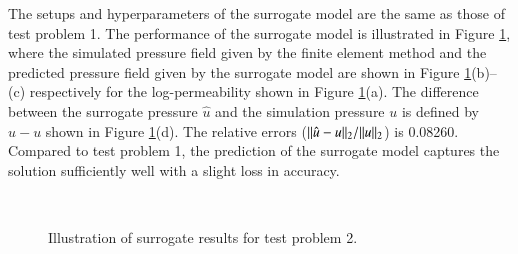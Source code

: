 The setups and hyperparameters of the surrogate model are the same as those of test problem 1. The performance of the surrogate model is illustrated in Figure \ref{highdim_surrogate_plot}, where the simulated pressure field given by the finite element method and the predicted pressure field given by the surrogate model are shown in Figure \ref{highdim_surrogate_plot}(b)--(c) respectively for the log-permeability shown in Figure \ref{highdim_surrogate_plot}(a). 
The difference between the surrogate pressure $\hat{u}$ and the simulation pressure $u$ is defined by $\hat{u}-u$ shown in Figure \ref{highdim_surrogate_plot}(d).
The relative errors ($\Arrowvert \hat{u}-u \Arrowvert_2/\Arrowvert u \Arrowvert_2$) is 0.08260.
Compared to test problem 1, the prediction of the surrogate model captures the solution sufficiently well with a slight loss in accuracy.    
\begin{figure}
	\centering
	\quad
	\\
	\quad
	\caption{Illustration of surrogate results for test problem 2.}
    \label{highdim_surrogate_plot}
\end{figure}
